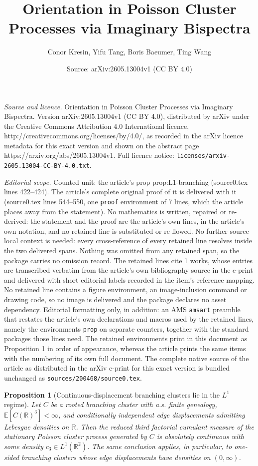 \documentclass[10pt,a4paper]{amsart}
\title{Orientation in Poisson Cluster Processes via Imaginary Bispectra}
\author{Conor Kresin, Yifu Tang, Boris Baeumer, Ting Wang}
\date{Source: arXiv:2605.13004v1 (CC BY 4.0)}
\newtheorem{prop}{Proposition}
\newcommand{\E}{\mathbb{E}}
\newcommand{\R}{\mathbb{R}}
\begin{document}
\maketitle

\noindent\emph{Source and licence.} Orientation in Poisson Cluster Processes via Imaginary Bispectra. Version arXiv:2605.13004v1 (CC BY 4.0), distributed by arXiv under the Creative Commons Attribution 4.0 International licence, http://creativecommons.org/licenses/by/4.0/, as recorded in the arXiv licence metadata for this exact version and shown on the abstract page https://arxiv.org/abs/2605.13004v1. Full licence notice: \texttt{licenses/arxiv-2605.13004-CC-BY-4.0.txt}.\par\smallskip

\noindent\textit{Editorial scope.} Counted unit: the article's prop prop:L1-branching (source0.tex lines 422--424). The article's complete original proof of it is delivered with it (source0.tex lines 544--550, one \texttt{proof} environment of 7 lines, which the article places away from the statement). No mathematics is written, repaired or re-derived: the statement and the proof are the article's own lines, in the article's own notation, and no retained line is substituted or re-flowed.  No further source-local context is needed: every cross-reference of every retained line resolves inside the two delivered spans.  Nothing was omitted from any retained span, so the package carries no omission record.  The retained lines cite 1 works, whose entries are transcribed verbatim from the article's own bibliography source in the e-print and delivered with short editorial labels recorded in the item's reference mapping.  No retained line contains a figure environment, an image-inclusion command or drawing code, so no image is delivered and the package declares no asset dependency.  Editorial formatting only, in addition: an AMS \texttt{amsart} preamble that restates the article's own declarations and macros used by the retained lines, namely the environments \texttt{prop} on separate counters, together with the standard packages those lines need.  The retained environments print in this document as Proposition 1 in order of appearance, whereas the article prints the same items with the numbering of its own full document.  The complete native source of the article as distributed in the arXiv e-print for this exact version is bundled unchanged as \texttt{sources/200468/source0.tex}.
\begin{prop}[Continuous-displacement branching clusters lie in the $L^1$ regime]\label{prop:L1-branching}
Let $C$ be a rooted branching cluster with a.s. finite genealogy, $\E[C(\R)^3]<\infty$, and conditionally independent edge displacements admitting Lebesgue densities on $\R$. Then the reduced third factorial cumulant measure of the stationary Poisson cluster process generated by $C$ is absolutely continuous with some density $c_3\in L^1(\R^2)$. The same conclusion applies, in particular, to one-sided branching clusters whose edge displacements have densities on $(0,\infty)$.
\end{prop}
\end{document}
